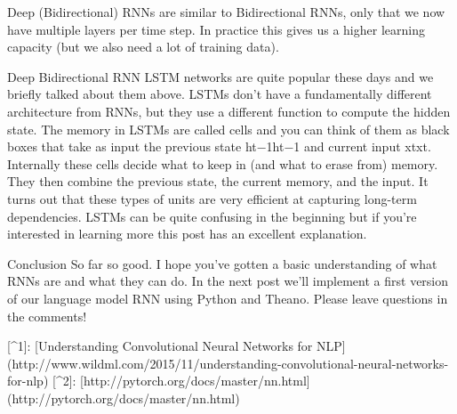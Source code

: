 Deep (Bidirectional) RNNs are similar to Bidirectional RNNs, only that we now have multiple layers per time step. In practice this gives us a higher learning capacity (but we also need a lot of training data).

Deep Bidirectional RNN LSTM networks are quite popular these days and we briefly talked about them above. LSTMs don’t have a fundamentally different architecture from RNNs, but they use a different function to compute the hidden state. The memory in LSTMs are called cells and you can think of them as black boxes that take as input the previous state ht−1ht−1 and current input xtxt. Internally these cells decide what to keep in (and what to erase from) memory. They then combine the previous state, the current memory, and the input. It turns out that these types of units are very efficient at capturing long-term dependencies. LSTMs can be quite confusing in the beginning but if you’re interested in learning more this post has an excellent explanation.

Conclusion
So far so good. I hope you’ve gotten a basic understanding of what RNNs are and what they can do. In the next post we’ll implement a first version of our language model RNN using Python and Theano. Please leave questions in the comments!


[^1]: [Understanding Convolutional Neural Networks for NLP](http://www.wildml.com/2015/11/understanding-convolutional-neural-networks-for-nlp)
[^2]: [http://pytorch.org/docs/master/nn.html](http://pytorch.org/docs/master/nn.html)